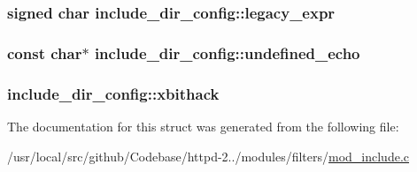 \subsubsection[{\texorpdfstring{legacy\+\_\+expr}{legacy_expr}}]{\setlength{\rightskip}{0pt plus 5cm}signed char include\+\_\+dir\+\_\+config\+::legacy\+\_\+expr}\hypertarget{structinclude__dir__config_ad6fe740072fa657abe56dae8268e8600}{}\label{structinclude__dir__config_ad6fe740072fa657abe56dae8268e8600}
\subsubsection[{\texorpdfstring{undefined\+\_\+echo}{undefined_echo}}]{\setlength{\rightskip}{0pt plus 5cm}const char$\ast$ include\+\_\+dir\+\_\+config\+::undefined\+\_\+echo}\hypertarget{structinclude__dir__config_a137936d77d5fb28a3f2d053597b861a3}{}\label{structinclude__dir__config_a137936d77d5fb28a3f2d053597b861a3}
\subsubsection[{\texorpdfstring{xbithack}{xbithack}}]{ include\+\_\+dir\+\_\+config\+::xbithack}\hypertarget{structinclude__dir__config_ad694e678dbe02df584e69828ce252f11}{}\label{structinclude__dir__config_ad694e678dbe02df584e69828ce252f11}


The documentation for this struct was generated from the following file\+:\begin{DoxyCompactItemize}
\item 
/usr/local/src/github/\+Codebase/httpd-\/2../modules/filters/\hyperlink{mod__include_8c}{mod\+\_\+include.\+c}\end{DoxyCompactItemize}
